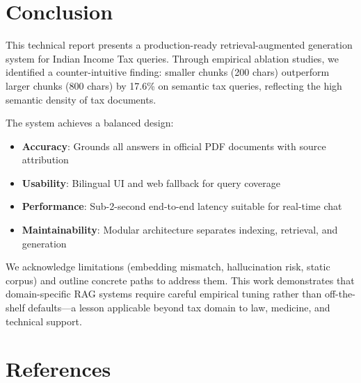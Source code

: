 \documentclass[11pt,a4paper]{article}
\begin{document}
\section{Conclusion}
\label{sec:conclusion}

This technical report presents a production-ready retrieval-augmented generation system for Indian Income Tax queries. Through empirical ablation studies, we identified a counter-intuitive finding: smaller chunks (200 chars) outperform larger chunks (800 chars) by 17.6\% on semantic tax queries, reflecting the high semantic density of tax documents.

The system achieves a balanced design:
\begin{itemize}
    \item \textbf{Accuracy}: Grounds all answers in official PDF documents with source attribution
    \item \textbf{Usability}: Bilingual UI and web fallback for query coverage
    \item \textbf{Performance}: Sub-2-second end-to-end latency suitable for real-time chat
    \item \textbf{Maintainability}: Modular architecture separates indexing, retrieval, and generation
\end{itemize}

We acknowledge limitations (embedding mismatch, hallucination risk, static corpus) and outline concrete paths to address them. This work demonstrates that domain-specific RAG systems require careful empirical tuning rather than off-the-shelf defaults---a lesson applicable beyond tax domain to law, medicine, and technical support.

\section*{References}
\label{sec:references}
\end{document}

